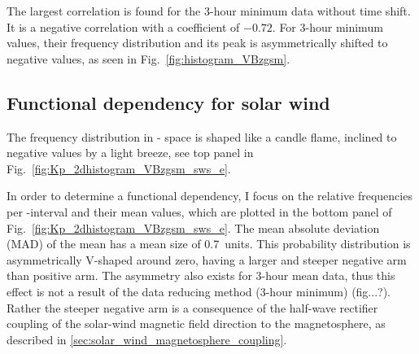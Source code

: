 The largest correlation is found for the 3-hour minimum data without time shift. It is a negative correlation with a coefficient of $-0.72$. For \vBz{} 3-hour minimum values, their frequency distribution and its peak is asymmetrically shifted to negative values, as seen in Fig.~\ref{fig:histogram_VBzgsm}.


\subsection{Functional dependency for solar wind}
The frequency distribution in \Kp-\vBz{} space is shaped like a candle flame, inclined to negative values by a light breeze, see top panel in Fig.~\ref{fig:Kp_2dhistogram_VBzgsm_sws_e}.
\begin{figure}
\end{figure}
In order to determine a functional dependency, I focus on the relative frequencies per \vBz-interval and their mean \Kp{} values, which are plotted in the bottom panel of Fig.~\ref{fig:Kp_2dhistogram_VBzgsm_sws_e}. The mean absolute deviation (MAD) of the mean has a mean size of \SI{0.7}{\Kp}~units. This probability distribution is asymmetrically V-shaped around zero, having a larger and steeper negative arm than positive arm. The asymmetry also exists for 3-hour mean data, thus this effect is not a result of the data reducing method (3-hour minimum) (fig...?). Rather the steeper negative arm is a consequence of the half-wave rectifier coupling of the solar-wind magnetic field direction to the magnetosphere, as described in \autoref{sec:solar_wind_magnetosphere_coupling}.\\

